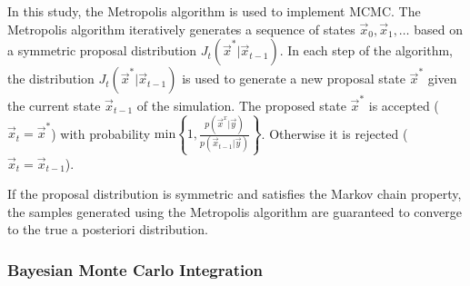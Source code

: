 \documentclass[journal abbreviation, manuscript]{copernicus}
\begin{document}
    In this study, the Metropolis algorithm is used to implement MCMC. The
    Metropolis algorithm iteratively generates a sequence of states $\vec{x}_0,
    \vec{x}_1, \ldots$ based on a symmetric proposal distribution
    $J_t(\vec{x}^* | \vec{x}_{t-1})$. In each step of the algorithm, the
    distribution $J_t(\vec{x}^* | \vec{x}_{t-1})$ is used to generate a new
    proposal state $\vec{x}^*$ given the current state $\vec{x}_{t-1}$ of the simulation.
    The proposed state $\vec{x}^*$ is accepted ($\vec{x}_t = \vec{x}^*$) with
    probability $\text{min} \left \{1, \frac{p(\vec{x}^x |
      \vec{y})}{p(\vec{x}_{t-1} | \vec{y})} \right \}$. Otherwise it is rejected
    ($\vec{x}_t = \vec{x}_{t-1}$).

    If the proposal distribution is symmetric and satisfies the Markov chain property, the
    samples generated using the Metropolis algorithm are guaranteed to converge to the
    true a posteriori distribution. 

\subsubsection{Bayesian Monte Carlo Integration}
\end{document}
